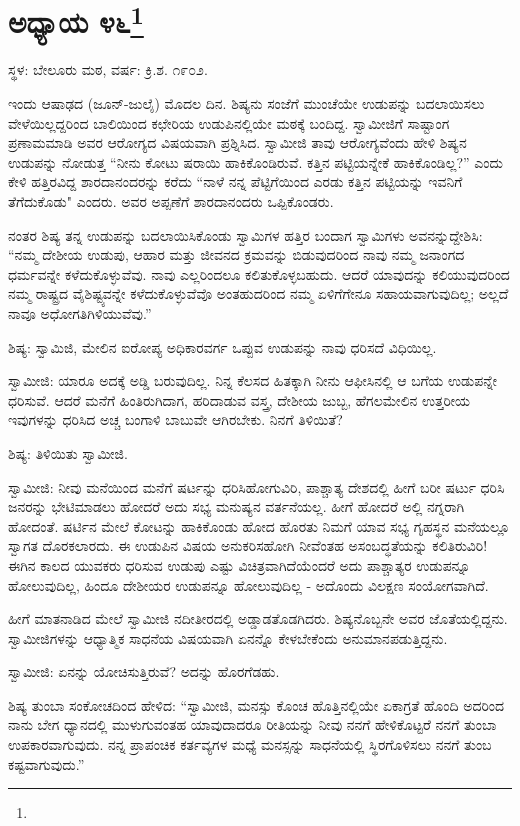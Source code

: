 \chapter[ಅಧ್ಯಾಯ ೪೬]{ಅಧ್ಯಾಯ ೪೬\protect\footnote{}}

\centerline{ಸ್ಥಳ: ಬೇಲೂರು ಮಠ, ವರ್ಷ: ಕ್ರಿ.ಶ. ೧೯೦೨.}

ಇಂದು ಆಷಾಢದ (ಜೂನ್-ಜುಲೈ) ಮೊದಲ ದಿನ. ಶಿಷ್ಯನು ಸಂಜೆಗೆ ಮುಂಚೆಯೇ ಉಡುಪನ್ನು ಬದಲಾಯಿಸಲು ವೇಳೆಯಿಲ್ಲದ್ದರಿಂದ ಬಾಲಿಯಿಂದ ಕಛೇರಿಯ ಉಡುಪಿನಲ್ಲಿಯೇ ಮಠಕ್ಕೆ ಬಂದಿದ್ದ. ಸ್ವಾಮೀಜಿಗೆ ಸಾಷ್ಟಾಂಗ ಪ್ರಣಾಮಮಾಡಿ ಅವರ ಆರೋಗ್ಯದ ವಿಷಯವಾಗಿ ಪ್ರಶ್ನಿಸಿದ. ಸ್ವಾಮೀಜಿ ತಾವು ಆರೋಗ್ಯವೆಂದು ಹೇಳಿ ಶಿಷ್ಯನ ಉಡುಪನ್ನು ನೋಡುತ್ತ “ನೀನು ಕೋಟು ಷರಾಯಿ ಹಾಕಿಕೊಂಡಿರುವೆ. ಕತ್ತಿನ ಪಟ್ಟಿಯನ್ನೇಕೆ ಹಾಕಿಕೊಂಡಿಲ್ಲ?” ಎಂದು ಕೇಳಿ ಹತ್ತಿರವಿದ್ದ ಶಾರದಾನಂದರನ್ನು ಕರೆದು “ನಾಳೆ ನನ್ನ ಪೆಟ್ಟಿಗೆಯಿಂದ ಎರಡು ಕತ್ತಿನ ಪಟ್ಟಿಯನ್ನು ಇವನಿಗೆ ತೆಗೆದುಕೊಡು" ಎಂದರು. ಅವರ ಅಪ್ಪಣೆಗೆ ಶಾರದಾನಂದರು ಒಪ್ಪಿಕೊಂಡರು.

ನಂತರ ಶಿಷ್ಯ ತನ್ನ ಉಡುಪನ್ನು ಬದಲಾಯಿಸಿಕೊಂಡು ಸ್ವಾಮಿಗಳ ಹತ್ತಿರ ಬಂದಾಗ ಸ್ವಾಮಿಗಳು ಅವನನ್ನುದ್ದೇಶಿಸಿ: “ನಮ್ಮ ದೇಶೀಯ ಉಡುಪು, ಆಹಾರ ಮತ್ತು ಜೀವನದ ಕ್ರಮವನ್ನು ಬಿಡುವುದರಿಂದ ನಾವು ನಮ್ಮ ಜನಾಂಗದ ಧರ್ಮವನ್ನೇ ಕಳೆದುಕೊಳ್ಳುವೆವು. ನಾವು ಎಲ್ಲರಿಂದಲೂ ಕಲಿತುಕೊಳ್ಳಬಹುದು. ಆದರೆ ಯಾವುದನ್ನು ಕಲಿಯುವುದರಿಂದ ನಮ್ಮ ರಾಷ್ಟ್ರದ ವೈಶಿಷ್ಟ್ಯವನ್ನೇ ಕಳೆದುಕೊಳ್ಳುವೆವೊ ಅಂತಹುದರಿಂದ ನಮ್ಮ ಏಳಿಗೆಗೇನೂ ಸಹಾಯವಾಗುವುದಿಲ್ಲ; ಅಲ್ಲದೆ ನಾವೂ ಅಧೋಗತಿಗಿಳಿಯುವೆವು.”

ಶಿಷ್ಯ: ಸ್ವಾಮಿಜಿ, ಮೇಲಿನ ಐರೋಪ್ಯ ಅಧಿಕಾರವರ್ಗ ಒಪ್ಪುವ ಉಡುಪನ್ನು ನಾವು ಧರಿಸದೆ ವಿಧಿಯಿಲ್ಲ.

ಸ್ವಾಮೀಜಿ: ಯಾರೂ ಅದಕ್ಕೆ ಅಡ್ಡಿ ಬರುವುದಿಲ್ಲ. ನಿನ್ನ ಕೆಲಸದ ಹಿತಕ್ಕಾಗಿ ನೀನು ಆಫೀಸಿನಲ್ಲಿ ಆ ಬಗೆಯ ಉಡುಪನ್ನೇ ಧರಿಸುವೆ. ಆದರೆ ಮನೆಗೆ ಹಿಂತಿರುಗಿದಾಗ, ಹರಿದಾಡುವ ವಸ್ತ್ರ, ದೇಶೀಯ ಜುಬ್ಬ, ಹೆಗಲಮೇಲಿನ ಉತ್ತರೀಯ ಇವುಗಳನ್ನು ಧರಿಸಿದ ಅಚ್ಚ ಬಂಗಾಳಿ ಬಾಬುವೇ ಆಗಿರಬೇಕು. ನಿನಗೆ ತಿಳಿಯಿತೆ?

ಶಿಷ್ಯ: ತಿಳಿಯಿತು ಸ್ವಾಮೀಜಿ.

ಸ್ವಾಮೀಜಿ: ನೀವು ಮನೆಯಿಂದ ಮನೆಗೆ ಷರ್ಟನ್ನು ಧರಿಸಿಹೋಗುವಿರಿ, ಪಾಶ್ಚಾತ್ಯ ದೇಶದಲ್ಲಿ ಹೀಗೆ ಬರೀ ಷರ್ಟು ಧರಿಸಿ ಜನರನ್ನು ಭೇಟಿಮಾಡಲು ಹೋದರೆ ಅದು ಸಭ್ಯ ಮನುಷ್ಯನ ವರ್ತನೆಯಲ್ಲ. ಹೀಗೆ ಹೋದರೆ ಅಲ್ಲಿ ನಗ್ನರಾಗಿ ಹೋದಂತೆ. ಷರ್ಟಿನ ಮೇಲೆ ಕೋಟನ್ನು ಹಾಕಿಕೊಂಡು ಹೋದ ಹೊರತು ನಿಮಗೆ ಯಾವ ಸಭ್ಯ ಗೃಹಸ್ಥನ ಮನೆಯಲ್ಲೂ ಸ್ವಾಗತ ದೊರಕಲಾರದು. ಈ ಉಡುಪಿನ ವಿಷಯ ಅನುಕರಿಸಹೋಗಿ ನೀವೆಂತಹ ಅಸಂಬದ್ಧತೆಯನ್ನು ಕಲಿತಿರುವಿರಿ! ಈಗಿನ ಕಾಲದ ಯುವಕರು ಧರಿಸುವ ಉಡುಪು ಎಷ್ಟು ವಿಚಿತ್ರವಾಗಿದೆಯೆಂದರೆ ಅದು ಪಾಶ್ಚಾತ್ಯರ ಉಡುಪನ್ನೂ ಹೋಲುವುದಿಲ್ಲ, ಹಿಂದೂ ದೇಶೀಯರ ಉಡುಪನ್ನೂ ಹೋಲುವುದಿಲ್ಲ - ಅದೊಂದು ವಿಲಕ್ಷಣ ಸಂಯೋಗವಾಗಿದೆ.

ಹೀಗೆ ಮಾತನಾಡಿದ ಮೇಲೆ ಸ್ವಾಮೀಜಿ ನದೀತೀರದಲ್ಲಿ ಅಡ್ಡಾಡತೊಡಗಿದರು. ಶಿಷ್ಯನೊಬ್ಬನೇ ಅವರ ಜೊತೆಯಲ್ಲಿದ್ದನು. ಸ್ವಾಮೀಜಿಗಳನ್ನು ಆಧ್ಯಾತ್ಮಿಕ ಸಾಧನೆಯ ವಿಷಯವಾಗಿ ಏನನ್ನೊ ಕೇಳಬೇಕೆಂದು ಅನುಮಾನಪಡುತ್ತಿದ್ದನು.

ಸ್ವಾಮೀಜಿ: ಏನನ್ನು ಯೋಚಿಸುತ್ತಿರುವೆ? ಅದನ್ನು ಹೊರಗೆಡಹು.

ಶಿಷ್ಯ ತುಂಬಾ ಸಂಕೋಚದಿಂದ ಹೇಳಿದ: “ಸ್ವಾಮೀಜಿ, ಮನಸ್ಸು ಕೊಂಚ ಹೊತ್ತಿನಲ್ಲಿಯೇ ಏಕಾಗ್ರತೆ ಹೊಂದಿ ಅದರಿಂದ ನಾನು ಬೇಗ ಧ್ಯಾನದಲ್ಲಿ ಮುಳುಗುವಂತಹ ಯಾವುದಾದರೂ ರೀತಿಯನ್ನು ನೀವು ನನಗೆ ಹೇಳಿಕೊಟ್ಟರೆ ನನಗೆ ತುಂಬಾ ಉಪಕಾರವಾಗುವುದು. ನನ್ನ ಪ್ರಾಪಂಚಿಕ ಕರ್ತವ್ಯಗಳ ಮಧ್ಯೆ ಮನಸ್ಸನ್ನು ಸಾಧನೆಯಲ್ಲಿ ಸ್ಥಿರಗೊಳಿಸಲು ನನಗೆ ತುಂಬ ಕಷ್ಟವಾಗುವುದು.”


